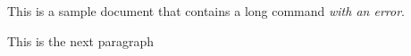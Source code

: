 \documentclass{article}
\begin{document}
This is a sample document that contains a long 
command \textit{with an error}.

This is the next paragraph
\end{document}

